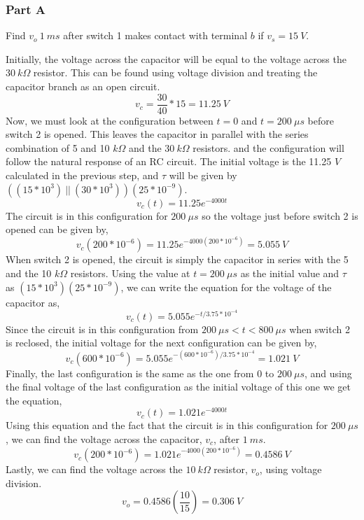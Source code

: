 \documentclass[12pt]{article}
\begin{document}
    \subsubsection*{Part A} Find $ v_{o}\ 1\ ms $ after switch 1 makes contact with terminal $ b $ if $ v_{s} = 15\ V $. \\
    \par Initially, the voltage across the capacitor will be equal to the voltage across the $ 30\ k\Omega $ resistor. This can be found using voltage division and treating the capacitor branch as an open circuit.
    \[
        v_c = \frac{30}{40} * 15 = 11.25\ V
    \]
    Now, we must look at the configuration between $ t = 0 $ and $ t = 200\ \mu s $ before switch 2 is opened. This leaves the capacitor in parallel with the series combination of 5 and 10 $ k\Omega $ and the $ 30\ k\Omega $ resistors. and the configuration will follow the natural response of an RC circuit. The initial voltage is the 11.25 $ V $ calculated in the previous step, and $ \tau $ will be given by $ ((15 * 10^{3})\ ||\ (30 * 10^{3}))(25 * 10^{-9}) $.
    \[
        v_c(t) = 11.25 e^{-4000t}
    \]
    The circuit is in this configuration for $ 200\ \mu s $ so the voltage just before switch 2 is opened can be given by,
    \[
        v_c(200 * 10^{-6}) = 11.25 e^{-4000(200 * 10^{-6})} = 5.055\ V
    \]
    When switch 2 is opened, the circuit is simply the capacitor in series with the 5 and the 10 $ k\Omega $ resistors. Using the value at $ t = 200\ \mu s $ as the initial value and $ \tau $ as $ (15 * 10^{3})(25 * 10^{-9}) $, we can write the equation for the voltage of the capacitor as,
    \[
        v_c(t) = 5.055 e^{-t / 3.75 * 10^{-4}}
    \]
    Since the circuit is in this configuration from $ 200\ \mu s < t < 800\ \mu s $ when switch 2 is reclosed, the initial voltage for the next configuration can be given by,
    \[
        v_c(600 * 10^{-6}) = 5.055 e^{-(600 * 10^{-6}) / 3.75 * 10^{-4}} = 1.021\ V
    \]
    Finally, the last configuration is the same as the one from 0 to $ 200\ \mu s $, and using the final voltage of the last configuration as the initial voltage of this one we get the equation,
    \[
        v_c(t) = 1.021 e^{-4000t}
    \]
    Using this equation and the fact that the circuit is in this configuration for $ 200\ \mu s $, we can find the voltage across the capacitor, $ v_c $, after $ 1\ ms $.
    \[
        v_c(200 * 10^{-6}) = 1.021 e^{-4000(200 * 10^{-6})} = 0.4586\ V
    \]
    Lastly, we can find the voltage across the $ 10\ k\Omega $ resistor, $ v_{o} $, using voltage division.
    \[
        v_{o} = 0.4586\left( \frac{10}{15} \right) = \boxed{0.306\ V}
    \]
\end{document}
